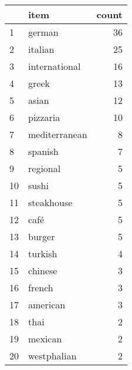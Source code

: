 \begin{tabular}{llr}
\toprule
{} &              item &  count \\
\midrule
1  &            german &     36 \\
2  &           italian &     25 \\
3  &     international &     16 \\
4  &             greek &     13 \\
5  &             asian &     12 \\
6  &          pizzaria &     10 \\
7  &     mediterranean &      8 \\
8  &           spanish &      7 \\
9  &          regional &      5 \\
10 &             sushi &      5 \\
11 &        steakhouse &      5 \\
12 &              café &      5 \\
13 &            burger &      5 \\
14 &           turkish &      4 \\
15 &           chinese &      3 \\
16 &            french &      3 \\
17 &          american &      3 \\
18 &              thai &      2 \\
19 &           mexican &      2 \\
20 &       westphalian &      2 \\
\bottomrule
\end{tabular}
